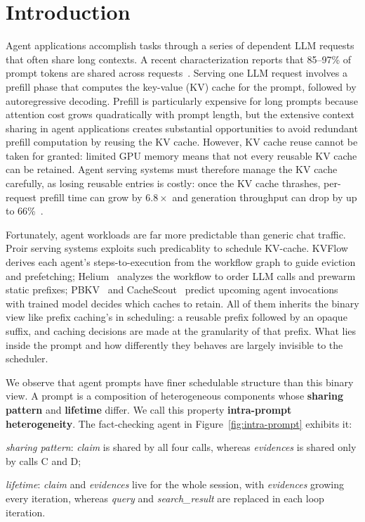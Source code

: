 \section{Introduction}
\label{sec:intro}
Agent applications accomplish tasks through a series of dependent LLM requests that often share long contexts. A recent characterization reports that 85--97\% of prompt tokens are shared across requests~\cite{srivatsa2025preble}. Serving one LLM request involves a prefill phase that computes the key-value (KV) cache for the prompt, followed by autoregressive decoding. Prefill is particularly expensive for long prompts because attention cost grows quadratically with prompt length, but the extensive context sharing in agent applications creates substantial opportunities to avoid redundant prefill computation by reusing the KV cache. However, KV cache reuse cannot be taken for granted: limited GPU memory means that not every reusable KV cache can be retained. Agent serving systems must therefore manage the KV cache carefully, as losing reusable entries is costly: once the KV cache thrashes, per-request prefill time can grow by $6.8\times$ and generation throughput can drop by up to 66\%~\cite{yuan2026agentic}.

Fortunately, agent workloads are far more predictable than generic chat traffic. Proir serving systems exploits such predicablity to  schedule KV-cache. KVFlow~\cite{pan2025kvflow} derives each agent's steps-to-execution from the workflow graph to guide eviction and prefetching; Helium~\cite{wadlom2026helium} analyzes the workflow to order LLM calls and prewarm static prefixes; PBKV~\cite{zheng2026pbkv} and CacheScout~\cite{zhang2026cachescout} predict upcoming agent invocations with trained model decides which caches to retain. All of them inherits the binary view like prefix caching's in scheduling: a reusable prefix followed by an opaque suffix, and caching decisions are made at the granularity of that prefix. What lies inside the prompt and how differently they behaves are largely invisible to the scheduler.

We observe that agent prompts have finer schedulable structure than this binary view. A prompt is a composition of heterogeneous components whose \textbf{sharing pattern} and \textbf{lifetime} differ. We call this property \textbf{intra-prompt heterogeneity}. The fact-checking agent in Figure~\ref{fig:intra-prompt} exhibits it:
\begin{enumerate*}[label=\textbf{(\roman*)}]
    \item \emph{sharing pattern}: \textit{claim} is shared by all four calls, whereas \textit{evidences} is shared only by calls C and D;
    \item \emph{lifetime}: \textit{claim} and \textit{evidences} live for the whole session, with \textit{evidences} growing every iteration, whereas \textit{query} and \textit{search\_result} are replaced in each loop iteration.
\end{enumerate*}

